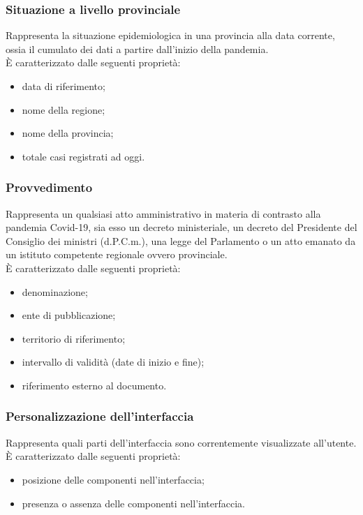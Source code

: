 \subsubsection{Situazione a livello provinciale}
\label{sss:situazione-livello-provinciale}
Rappresenta la situazione epidemiologica in una provincia alla data corrente, ossia il cumulato dei dati a partire dall'inizio della pandemia.\\
È caratterizzato dalle seguenti proprietà:
\begin{itemize}
    \item data di riferimento;
    \item nome della regione;
    \item nome della provincia;
    \item totale casi registrati ad oggi.
\end{itemize}

\subsubsection{Provvedimento}
\label{sss:provvedimento}
Rappresenta un qualsiasi atto amministrativo in materia di contrasto alla pandemia Covid-19, sia esso un decreto ministeriale, un decreto del Presidente del Consiglio dei ministri (d.P.C.m.), una legge del Parlamento o un atto emanato da un istituto competente regionale ovvero provinciale.\\
È caratterizzato dalle seguenti proprietà:
\begin{itemize}
    \item denominazione;
    \item ente di pubblicazione;
    \item territorio di riferimento;
    \item intervallo di validità (date di inizio e fine);
    \item riferimento esterno al documento.
\end{itemize}

\subsubsection{Personalizzazione dell'interfaccia}
\label{sss:personalizzazione-interfaccia}
Rappresenta quali parti dell'interfaccia sono correntemente visualizzate all'utente.\\
È caratterizzato dalle seguenti proprietà:
\begin{itemize}
    \item posizione delle componenti nell'interfaccia;
    \item presenza o assenza delle componenti nell'interfaccia.
\end{itemize}